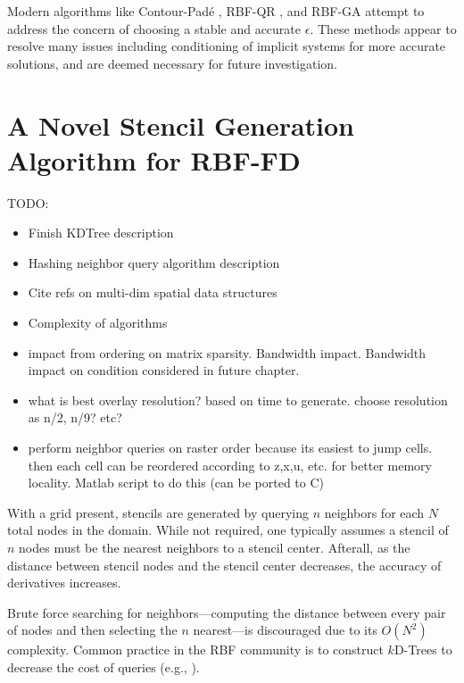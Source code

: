 \documentclass[11pt]{report}
\begin{document}
{Modern algorithms like Contour-Pad\'{e} \cite{Wright2003}, RBF-QR \cite{Fornberg2007, Fornberg2011a, Davydov2011}, and RBF-GA \cite{Fornberg2012} attempt to address the concern of choosing a stable and accurate $\epsilon$. These methods appear to resolve many issues including conditioning of implicit systems for more accurate solutions, and are deemed necessary for future investigation. 



\chapter{A Novel Stencil Generation Algorithm for RBF-FD}
\label{chap:stencils}

TODO:
\begin{itemize}
\item Finish KDTree description
\item Hashing neighbor query algorithm description
\item Cite refs on multi-dim spatial data structures
\item Complexity of algorithms
\item impact from ordering on matrix sparsity. Bandwidth impact. Bandwidth impact on condition considered in future chapter. 
\item what is best overlay resolution? based on time to generate. choose resolution as n/2, n/9? etc? 
\item perform neighbor queries on raster order because its easiest to jump cells. then each cell can be reordered according to z,x,u, etc. for better memory locality. Matlab script to do this (can be ported to C)
\end{itemize}

With a grid present, stencils are generated by querying $n$ neighbors for each $N$ total nodes in the domain. While not required, one typically assumes a stencil of $n$ nodes must be the nearest neighbors to a stencil center. Afterall, as the distance between stencil nodes and the stencil center decreases, the accuracy of derivatives increases. 

Brute force searching for neighbors---computing the distance between every pair of nodes and then selecting the $n$ nearest---is discouraged due to its $O(N^2)$ complexity. Common practice in the RBF community is to construct $k$D-Trees to decrease the cost of queries (e.g., \cite{Fasshauer2007, FlyerLehto11, FornbergLehto11}). 


}
\end{document}
